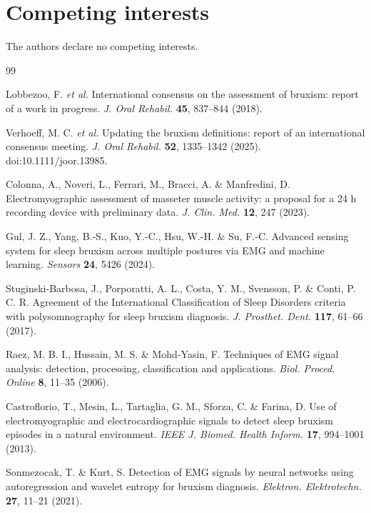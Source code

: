 \documentclass[pdflatex,sn-nature,iicol]{sn-jnl}
\begin{document}
\section*{Competing interests}
The authors declare no competing interests.

\begin{thebibliography}{99}

Lobbezoo, F. \emph{et al.} International consensus on the assessment of bruxism: report of a work in progress. \emph{J. Oral Rehabil.} \textbf{45}, 837--844 (2018).

Verhoeff, M. C. \emph{et al.} Updating the bruxism definitions: report of an international consensus meeting. \emph{J. Oral Rehabil.} \textbf{52}, 1335--1342 (2025). doi:10.1111/joor.13985.

Colonna, A., Noveri, L., Ferrari, M., Bracci, A. \& Manfredini, D. Electromyographic assessment of masseter muscle activity: a proposal for a 24 h recording device with preliminary data. \emph{J. Clin. Med.} \textbf{12}, 247 (2023).

Gul, J. Z., Yang, B.-S., Kuo, Y.-C., Hsu, W.-H. \& Su, F.-C. Advanced sensing system for sleep bruxism across multiple postures via EMG and machine learning. \emph{Sensors} \textbf{24}, 5426 (2024).

Stuginski-Barbosa, J., Porporatti, A. L., Costa, Y. M., Svensson, P. \& Conti, P. C. R. Agreement of the International Classification of Sleep Disorders criteria with polysomnography for sleep bruxism diagnosis. \emph{J. Prosthet. Dent.} \textbf{117}, 61--66 (2017).

Raez, M. B. I., Hussain, M. S. \& Mohd-Yasin, F. Techniques of EMG signal analysis: detection, processing, classification and applications. \emph{Biol. Proced. Online} \textbf{8}, 11--35 (2006).

Castroflorio, T., Mesin, L., Tartaglia, G. M., Sforza, C. \& Farina, D. Use of electromyographic and electrocardiographic signals to detect sleep bruxism episodes in a natural environment. \emph{IEEE J. Biomed. Health Inform.} \textbf{17}, 994--1001 (2013).

Sonmezocak, T. \& Kurt, S. Detection of EMG signals by neural networks using autoregression and wavelet entropy for bruxism diagnosis. \emph{Elektron. Elektrotechn.} \textbf{27}, 11--21 (2021).


\end{thebibliography}
\end{document}
